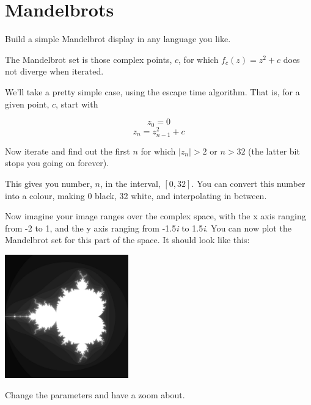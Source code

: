 \documentclass{article}
\begin{document}
    \section{Mandelbrots}
        Build a simple Mandelbrot display in any language you like.
        
        The Mandelbrot set is those complex points, $c$, for which $f_c(z)=z^2+c$ does not diverge when iterated.
        
        We'll take a pretty simple case, using the escape time algorithm.  That is, for a given point, $c$, start with 
        
        $$z_0 = 0$$
        $$z_n = z_{n-1}^2 + c$$
        
        Now iterate and find out the first $n$ for which $|z_n| > 2$ or $n > 32$ (the latter bit stops you going on forever).  
        
        This gives you number, $n$, in the interval, $[0,32]$. You can convert this number into a colour, making 0 black, 32 white, and
        interpolating in between.
        
        Now imagine your image ranges over the complex space, with the x axis ranging from -2 to 1, and the y axis ranging from
        -1.5\emph{i} to 1.5\emph{i}. You can now plot the Mandelbrot set for this part of the space. It should look like this:
        
        \begin{center}
            \includegraphics[width=0.4\textwidth]{mandelbrot}
        \end{center}
        
        Change the parameters and have a zoom about.
        
\end{document}
